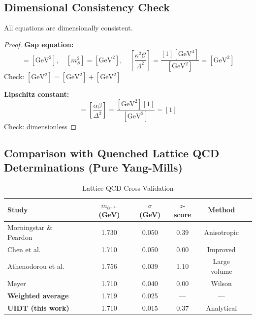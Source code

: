 \subsection{Dimensional Consistency Check}

\begin{theorem}
\label{thm:dimensional}
All equations are dimensionally consistent.
\end{theorem}

\begin{proof}
\textbf{Gap equation:}
\begin{equation}
[\Delta^2] = [\mathrm{GeV}^2], \quad
[m_S^2] = [\mathrm{GeV}^2], \quad
\left[\frac{\kappa^2\mathcal{C}}{\Lambda^2}\right] = \frac{[1][\mathrm{GeV}^4]}{[\mathrm{GeV}^2]} = [\mathrm{GeV}^2]
\end{equation}
Check: $[\mathrm{GeV}^2] = [\mathrm{GeV}^2] + [\mathrm{GeV}^2]$ \checkmark

\textbf{Lipschitz constant:}
\begin{equation}
[L] = \left[\frac{\alpha\beta}{\Delta^2}\right] = \frac{[\mathrm{GeV}^2][1]}{[\mathrm{GeV}^2]} = [1]
\end{equation}
Check: dimensionless \checkmark
\end{proof}

\subsection{Comparison with \textbf{Quenched} Lattice QCD Determinations (Pure Yang-Mills)}

\begin{table}[htbp]
\centering
\caption{Lattice QCD Cross-Validation}
\label{tab:lattice_app}
\begin{tabular}{@{}lccccc@{}}
\toprule
\textbf{Study} & \textbf{$m_{0^{++}}$ (GeV)} & \textbf{$\sigma$ (GeV)} & 
\textbf{$z$-score} & \textbf{Method} \\
\midrule
Morningstar \& Peardon~\cite{MorningstarPeardon1999} & 1.730 & 0.050 & 0.39 & Anisotropic \\
Chen et al.~\cite{Chen2006} & 1.710 & 0.050 & 0.00 & Improved \\
Athenodorou et al.~\cite{Athenodorou2021} & 1.756 & 0.039 & 1.10 & Large volume \\
Meyer~\cite{Meyer2005} & 1.710 & 0.040 & 0.00 & Wilson \\
\midrule
\textbf{Weighted average} & 1.719 & 0.025 & --- & --- \\
\textbf{UIDT (this work)} & 1.710 & 0.015 & 0.37 & Analytical \\
\bottomrule
\end{tabular}
\end{table}

